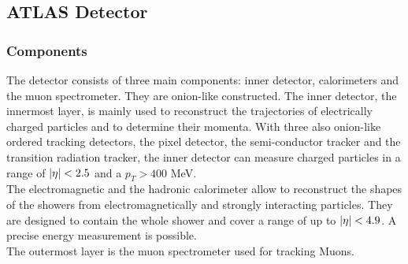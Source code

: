\documentclass[12pt, a4paper, bibliography=totoc]{scrartcl}
\begin{document}
\begin{multicols}{2}
\subsection{ATLAS Detector}
\subsubsection{Components}
The detector consists of three main components: inner detector, calorimeters and the muon spectrometer.
They are onion-like constructed. 
The inner detector, the innermost layer, is mainly used to reconstruct the trajectories of electrically charged particles and to determine their momenta. 
With three also onion-like ordered tracking detectors, the pixel detector, the semi-conductor tracker and the transition radiation tracker, the inner detector can measure charged particles in a range of $\abs{\eta} < 2.5$ and a $p_{T} > 400$ \si{MeV}.\\

The electromagnetic and the hadronic calorimeter allow to reconstruct the shapes of the showers from electromagnetically and strongly interacting particles. 
They are designed to contain the whole shower and cover a range of up to $\abs{\eta} < 4.9$. 
A precise energy measurement is possible.\\
The outermost layer is the muon spectrometer used for tracking Muons.


\end{multicols}
\end{document}
